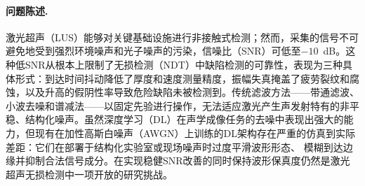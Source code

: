 \paragraph{问题陈述.}
激光超声（LUS）能够对关键基础设施进行非接触式检测；然而，采集的信号不可避免地受到强烈环境噪声和光子噪声的污染，信噪比（SNR）可低至$-10$~dB\cite{laser_ultrasound_noise}。这种低SNR从根本上限制了无损检测（NDT）中缺陷检测的可靠性，表现为三种具体形式：到达时间抖动降低了厚度和速度测量精度\cite{arrival_time_jitter}，振幅失真掩盖了疲劳裂纹和腐蚀\cite{amplitude_distortion}，以及升高的假阴性率导致危险缺陷未被检测到\cite{false_negative_ndt}。传统滤波方法——带通滤波、小波去噪和谱减法——以固定先验进行操作，无法适应激光产生声发射特有的非平稳、结构化噪声\cite{conventional_filter_limits}。虽然深度学习（DL）在声学成像任务的去噪中表现出强大的能力\cite{deep_learning_ultrasound}，但现有在加性高斯白噪声（AWGN）上训练的DL架构存在严重的仿真到实际差距：它们在部署于结构化实验室或现场噪声时过度平滑波形形态、
模糊到达边缘并抑制合法信号成分\cite{over_smoothing_issue,sim_to_real_gap}。在实现稳健SNR改善的同时保持波形保真度仍然是激光超声无损检测中一项开放的研究挑战。
